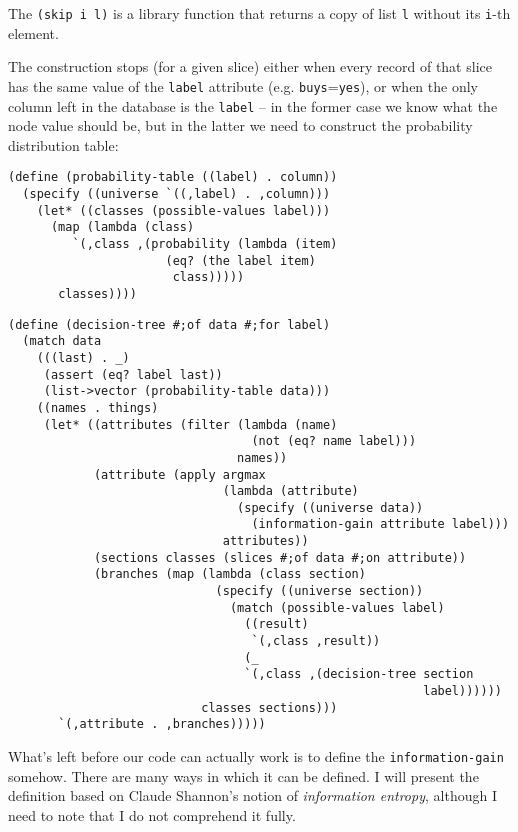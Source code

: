 The \texttt{(skip i l)} is a library function that returns a copy
of list \texttt{l} without its \texttt{i}-th element.

The construction stops (for a given slice) either when
every record of that slice has the same value of the \texttt{label}
attribute (e.g. \texttt{buys}=\texttt{yes}), or when the
only column left in the database is the \texttt{label} -- in
the former case we know what the node value should be, but in
the latter we need to construct the probability distribution
table:

\begin{Verbatim}[samepage=true]
(define (probability-table ((label) . column))
  (specify ((universe `((,label) . ,column)))
    (let* ((classes (possible-values label)))
      (map (lambda (class)
	     `(,class ,(probability (lambda (item)
				      (eq? (the label item)
					   class)))))
	   classes))))
\end{Verbatim}
\begin{Verbatim}[samepage=true]
(define (decision-tree #;of data #;for label)
  (match data
    (((last) . _)
     (assert (eq? label last))
     (list->vector (probability-table data)))
    ((names . things)
     (let* ((attributes (filter (lambda (name)
                                  (not (eq? name label)))
                                names))
            (attribute (apply argmax
                              (lambda (attribute)
                                (specify ((universe data))
                                  (information-gain attribute label)))
                              attributes))
            (sections classes (slices #;of data #;on attribute))
            (branches (map (lambda (class section)
                             (specify ((universe section))
                               (match (possible-values label)
                                 ((result)
                                  `(,class ,result))
                                 (_
                                 `(,class ,(decision-tree section
                                                          label))))))
                           classes sections)))
       `(,attribute . ,branches)))))
\end{Verbatim}

What's left before our code can actually work is to define
the \texttt{information\--gain} somehow. There are many ways
in which it can be defined. I will present the definition
based on Claude Shannon's notion of \textit{information entropy},
although I need to note that I do not comprehend it fully.

